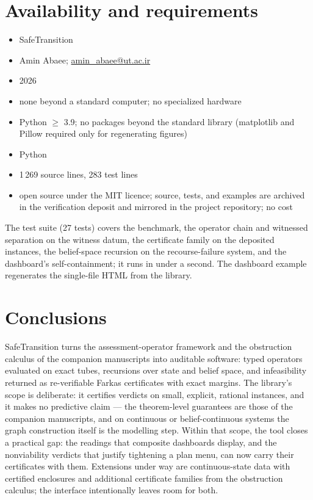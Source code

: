 \documentclass[3p,11pt]{elsarticle}
\begin{document}
\section{Availability and requirements}\label{sec:availability}

\begin{itemize}
\item[\textbf{Name:}] SafeTransition
\item[\textbf{Developer and contact:}] Amin Abaee;
\href{mailto:amin_abaee@ut.ac.ir}{amin\_abaee@ut.ac.ir}
\item[\textbf{Year first available:}] 2026
\item[\textbf{Hardware required:}] none beyond a standard computer; no
specialized hardware
\item[\textbf{Software required:}] Python $\geq$ 3.9; no packages beyond the
standard library (matplotlib and Pillow required only for regenerating
figures)
\item[\textbf{Program language:}] Python
\item[\textbf{Program size:}] 1\,269 source lines, 283 test lines
\item[\textbf{Availability and cost:}] open source under the MIT licence;
source, tests, and examples are archived in the verification deposit
\citep{Deposit2026} and mirrored in the project repository; no cost
\end{itemize}

The test suite (27 tests) covers the benchmark, the operator chain and
witnessed separation on the witness datum, the certificate family on the
deposited instances, the belief-space recursion on the recourse-failure
system, and the dashboard's self-containment; it runs in under a second.
The dashboard example regenerates the single-file HTML from the library.

\section{Conclusions}\label{sec:conclusions}

SafeTransition turns the assessment-operator framework and the obstruction
calculus of the companion manuscripts into auditable software: typed
operators evaluated on exact tubes, recursions over state and belief space,
and infeasibility returned as re-verifiable Farkas certificates with exact
margins. The library's scope is deliberate: it certifies verdicts on small,
explicit, rational instances, and it makes no predictive claim --- the
theorem-level guarantees are those of the companion manuscripts, and on
continuous or belief-continuous systems the graph construction itself is
the modelling step. Within that scope, the tool closes a practical gap:
the readings that composite dashboards display, and the nonviability
verdicts that justify tightening a plan menu, can now carry their
certificates with them. Extensions under way are continuous-state data with
certified enclosures and additional certificate families from the
obstruction calculus; the interface intentionally leaves room for both.
\end{document}

